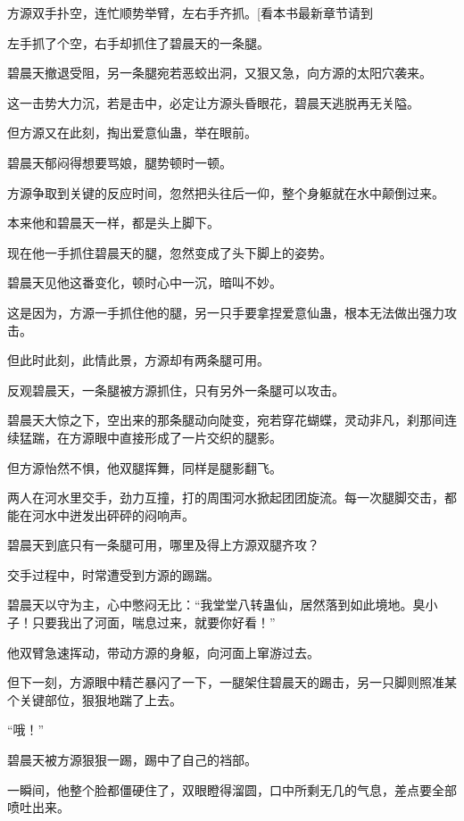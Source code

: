 
\begin{this_body}

方源双手扑空，连忙顺势举臂，左右手齐抓。[看本书最新章节请到

左手抓了个空，右手却抓住了碧晨天的一条腿。

碧晨天撤退受阻，另一条腿宛若恶蛟出洞，又狠又急，向方源的太阳穴袭来。

这一击势大力沉，若是击中，必定让方源头昏眼花，碧晨天逃脱再无关隘。

但方源又在此刻，掏出爱意仙蛊，举在眼前。

碧晨天郁闷得想要骂娘，腿势顿时一顿。

方源争取到关键的反应时间，忽然把头往后一仰，整个身躯就在水中颠倒过来。

本来他和碧晨天一样，都是头上脚下。

现在他一手抓住碧晨天的腿，忽然变成了头下脚上的姿势。

碧晨天见他这番变化，顿时心中一沉，暗叫不妙。

这是因为，方源一手抓住他的腿，另一只手要拿捏爱意仙蛊，根本无法做出强力攻击。

但此时此刻，此情此景，方源却有两条腿可用。

反观碧晨天，一条腿被方源抓住，只有另外一条腿可以攻击。

碧晨天大惊之下，空出来的那条腿动向陡变，宛若穿花蝴蝶，灵动非凡，刹那间连续猛踹，在方源眼中直接形成了一片交织的腿影。

但方源怡然不惧，他双腿挥舞，同样是腿影翻飞。

两人在河水里交手，劲力互撞，打的周围河水掀起团团旋流。每一次腿脚交击，都能在河水中迸发出砰砰的闷响声。

碧晨天到底只有一条腿可用，哪里及得上方源双腿齐攻？

交手过程中，时常遭受到方源的踢踹。

碧晨天以守为主，心中憋闷无比：“我堂堂八转蛊仙，居然落到如此境地。臭小子！只要我出了河面，喘息过来，就要你好看！”

他双臂急速挥动，带动方源的身躯，向河面上窜游过去。

但下一刻，方源眼中精芒暴闪了一下，一腿架住碧晨天的踢击，另一只脚则照准某个关键部位，狠狠地踹了上去。

“哦！”

碧晨天被方源狠狠一踢，踢中了自己的裆部。

一瞬间，他整个脸都僵硬住了，双眼瞪得溜圆，口中所剩无几的气息，差点要全部喷吐出来。


\end{this_body}
